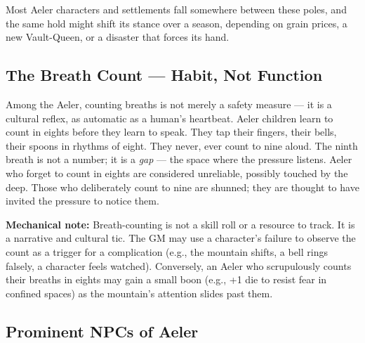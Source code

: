 Most Aeler characters and settlements fall somewhere between these poles, and the same hold might shift its stance over a season, depending on grain prices, a new Vault-Queen, or a disaster that forces its hand.

\subsection*{The Breath Count --- Habit, Not Function}
\label{sec:aeler-breath}

Among the Aeler, counting breaths is not merely a safety measure --- it is a cultural reflex, as automatic as a human's heartbeat. Aeler children learn to count in eights before they learn to speak. They tap their fingers, their bells, their spoons in rhythms of eight. They never, ever count to nine aloud. The ninth breath is not a number; it is a \emph{gap} --- the space where the pressure listens. Aeler who forget to count in eights are considered unreliable, possibly touched by the deep. Those who deliberately count to nine are shunned; they are thought to have invited the pressure to notice them.

\textbf{Mechanical note:} Breath-counting is not a skill roll or a resource to track. It is a narrative and cultural tic. The GM may use a character's failure to observe the count as a trigger for a complication (e.g., the mountain shifts, a bell rings falsely, a character feels watched). Conversely, an Aeler who scrupulously counts their breaths in eights may gain a small boon (e.g., +1 die to resist fear in confined spaces) as the mountain's attention slides past them.

\subsection*{Prominent NPCs of Aeler}
\label{sec:aeler-npcs}

